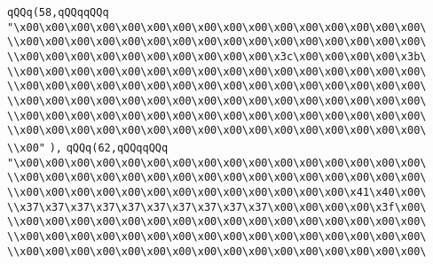 \verb|qQQq(58,qQQqqQQq|\newline
\verb|"\x00\x00\x00\x00\x00\x00\x00\x00\x00\x00\x00\x00\x00\x00\x00\x00\|\newline
\verb|\\x00\x00\x00\x00\x00\x00\x00\x00\x00\x00\x00\x00\x00\x00\x00\x00\|\newline
\verb|\\x00\x00\x00\x00\x00\x00\x00\x00\x00\x00\x3c\x00\x00\x00\x00\x3b\|\newline
\verb|\\x00\x00\x00\x00\x00\x00\x00\x00\x00\x00\x00\x00\x00\x00\x00\x00\|\newline
\verb|\\x00\x00\x00\x00\x00\x00\x00\x00\x00\x00\x00\x00\x00\x00\x00\x00\|\newline
\verb|\\x00\x00\x00\x00\x00\x00\x00\x00\x00\x00\x00\x00\x00\x00\x00\x00\|\newline
\verb|\\x00\x00\x00\x00\x00\x00\x00\x00\x00\x00\x00\x00\x00\x00\x00\x00\|\newline
\verb|\\x00\x00\x00\x00\x00\x00\x00\x00\x00\x00\x00\x00\x00\x00\x00\x00\|\newline
\verb|\\x00"|\newline
\verb|),|\newline
\verb|qQQq(62,qQQqqQQq|\newline
\verb|"\x00\x00\x00\x00\x00\x00\x00\x00\x00\x00\x00\x00\x00\x00\x00\x00\|\newline
\verb|\\x00\x00\x00\x00\x00\x00\x00\x00\x00\x00\x00\x00\x00\x00\x00\x00\|\newline
\verb|\\x00\x00\x00\x00\x00\x00\x00\x00\x00\x00\x00\x00\x00\x41\x40\x00\|\newline
\verb|\\x37\x37\x37\x37\x37\x37\x37\x37\x37\x37\x00\x00\x00\x00\x3f\x00\|\newline
\verb|\\x00\x00\x00\x00\x00\x00\x00\x00\x00\x00\x00\x00\x00\x00\x00\x00\|\newline
\verb|\\x00\x00\x00\x00\x00\x00\x00\x00\x00\x00\x00\x00\x00\x00\x00\x00\|\newline
\verb|\\x00\x00\x00\x00\x00\x00\x00\x00\x00\x00\x00\x00\x00\x00\x00\x00\|\newline
